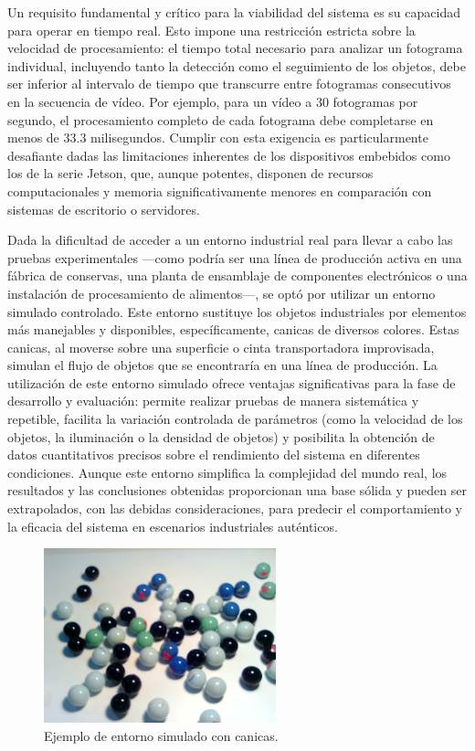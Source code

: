 \documentclass[11pt,spanish,listoffigures,listoftables]{tfgetsinf}
\begin{document}
Un requisito fundamental y crítico para la viabilidad del sistema es su capacidad para operar en tiempo real. Esto impone una restricción estricta sobre la velocidad de procesamiento: el tiempo total necesario para analizar un fotograma individual, incluyendo tanto la detección como el seguimiento de los objetos, debe ser inferior al intervalo de tiempo que transcurre entre fotogramas consecutivos en la secuencia de vídeo. Por ejemplo, para un vídeo a 30 fotogramas por segundo, el procesamiento completo de cada fotograma debe completarse en menos de 33.3 milisegundos. Cumplir con esta exigencia es particularmente desafiante dadas las limitaciones inherentes de los dispositivos embebidos como los de la serie Jetson, que, aunque potentes, disponen de recursos computacionales y memoria significativamente menores en comparación con sistemas de escritorio o servidores.

Dada la dificultad de acceder a un entorno industrial real para llevar a cabo las pruebas experimentales —como podría ser una línea de producción activa en una fábrica de conservas, una planta de ensamblaje de componentes electrónicos o una instalación de procesamiento de alimentos—, se optó por utilizar un entorno simulado controlado. Este entorno sustituye los objetos industriales por elementos más manejables y disponibles, específicamente, canicas de diversos colores. Estas canicas, al moverse sobre una superficie o cinta transportadora improvisada, simulan el flujo de objetos que se encontraría en una línea de producción. La utilización de este entorno simulado ofrece ventajas significativas para la fase de desarrollo y evaluación: permite realizar pruebas de manera sistemática y repetible, facilita la variación controlada de parámetros (como la velocidad de los objetos, la iluminación o la densidad de objetos) y posibilita la obtención de datos cuantitativos precisos sobre el rendimiento del sistema en diferentes condiciones. Aunque este entorno simplifica la complejidad del mundo real, los resultados y las conclusiones obtenidas proporcionan una base sólida y pueden ser extrapolados, con las debidas consideraciones, para predecir el comportamiento y la eficacia del sistema en escenarios industriales auténticos.

\begin{figure}[H]
   \centering
   \includegraphics[width=0.6\textwidth]{images/diseno_e_implementacion/ejemplo_canicas.png}
   \caption[Ejemplo de entorno simulado con canicas]{Ejemplo de entorno simulado con canicas.}
   \label{fig:entorno_simulado}
\end{figure}
\end{document}
